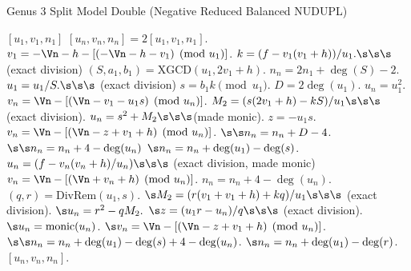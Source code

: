 \begin{algorithm}[htbp]
\caption{Genus 3 Split Model Double (Negative Reduced Balanced NUDUPL)}
\label{alg:g3balnudupl}
\begin{algorithmic}[1]
\Require $[u_1,v_1,n_1]$ 
\Ensure $[u_n,v_n,n_n] = 2[u_1,v_1,n_1]$.
\vspace{5pt}
    \State $v_1 = -\Vn - h - [(-\Vn - h - v_1) \pmod{u_1}]$.
\EndIf
\State $k = (f - v_1(v_1 + h))/u_1. \s\s\s$ (exact division)
\State $(S,a_1,b_1) = \mathrm{XGCD}(u_1,2v_1 + h)$.
\State $n_n = 2n_1 + \deg(S) - 2$.
    \State $u_1 = u_1/S. \s\s\s$ (exact division)
\EndIf
\State $s = b_1k \pmod{u_1}$.
\State $D = 2\deg(u_1)$.
    \State $u_n = u_1^2$.
    \State $v_n = \Vn - [(\Vn - v_1 - u_1s) \pmod{u_n}]$.
    \State $M_2 = (s(2v_1 + h) - kS)/u_1 \s\s\s $(exact division).
    \State $u_n = s^2 + M_2 \s\s\s$(made monic).
    \State $z = -u_1s$.
    \State $v_n = \Vn - [(\Vn - z + v_1 + h) \pmod{u_n}]$.
     $\s\s n_n = n_n + D - 4$.
    \Else
         $\s\s n_n = n_n + 4 - \deg(u_n)$ 
        \Else \hspace{75pt} $\s n_n = n_n + \deg(u_1) - \deg(s)$.
        \EndIf
            \State $u_n = (f - v_n(v_n + h)/u_n) \s\s\s$ (exact division, made monic)
            \State $v_n = \Vn - [(\Vn + v_n + h) \pmod{u_n}]$.
            \State $n_n = n_n + 4 - \deg(u_n)$.
        \EndIf
    \EndIf
\Else \hspace{2pt} 
    \State $(q,r) = \mathrm{DivRem}(u_1,s)$.
    \State $\s M_2 = (r(v_1 + v_1 + h) + kq)/u_1 \s\s\s$ (exact division).
    \State $\s u_n = r^2 - qM_2.$
    \State $\s z = (u_1r - u_n)/q \s\s\s$ (exact division).
    \State $\s u_n = \mathrm{monic}(u_n)$.
    \State $\s v_n = \Vn - [(\Vn - z + v_1 + h) \pmod{u_n}]$.
     $\s\s n_n = n_n + \deg(u_1) - \deg(s) + 4 - \deg(u_n)$.
    \Else \hspace{74pt} $\s n_n = n_n + \deg(u_1) - \deg(r)$.
    \EndIf
\EndIf
\State \Return $[u_n,v_n,n_n]$.
\end{algorithmic}
\end{algorithm}
    
